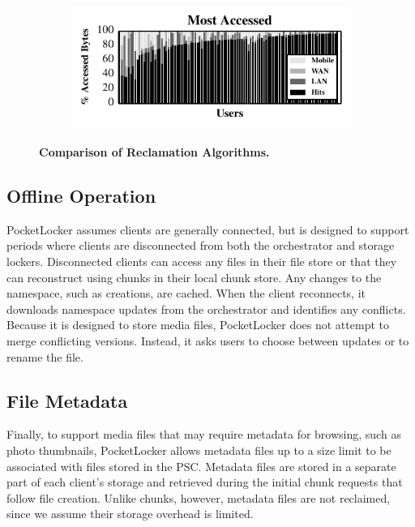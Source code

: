 \begin{figure}[t]
\begin{subfigure}[t]{0.95\columnwidth}
  \end{subfigure}\\
  \begin{subfigure}[t]{0.95\columnwidth}

    \includegraphics[width=\columnwidth]{./figures/pocketlocker/AccessSimulatorPerformanceGraph.pdf}

  \end{subfigure}

  \caption{\small \textbf{Comparison of Reclamation Algorithms.}}

  \label{fig-simulation-policy}
  
  \vspace*{-0.2in}
\end{figure}

\subsection{Offline Operation}

PocketLocker assumes clients are generally connected, but is designed to
support periods where clients are disconnected from both the orchestrator and
storage lockers.  Disconnected clients can access any files in their file store
or that they can reconstruct using chunks in their local chunk store. Any
changes to the namespace, such as creations, are cached.  When the client
reconnects, it downloads namespace updates from the orchestrator and identifies
any conflicts. Because it is designed to store media files, PocketLocker does
not attempt to merge conflicting versions. Instead, it asks users to choose
between updates or to rename the file.

\subsection{File Metadata}

Finally, to support media files that may require metadata for browsing, such
as photo thumbnails, PocketLocker allows metadata files up to a size limit to
be associated with files stored in the PSC. Metadata files are stored in a
separate part of each client's storage and retrieved during the initial chunk
requests that follow file creation. Unlike chunks, however, metadata files
are not reclaimed, since we assume their storage overhead is limited.
